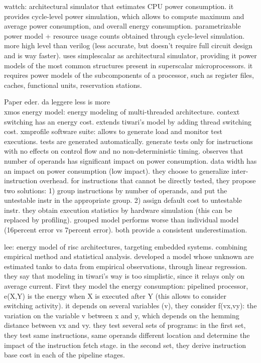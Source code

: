 wattch: architectural simulator that estimates CPU power consumption.
it provides cycle-level power simulation, which allows to compute maximum and average power consumption, and overall energy consumption.
parametrizable power model + resource usage counts obtained through cycle-level simulation. more high level than verilog (less accurate, but doesn't require full circuit design and is way faster). uses simplescalar as architectural simulator, providing it power models of the most common structures present in superscalar microprocessors.
it requires power models of the subcomponents of a processor, such as register files, caches, functional units, reservation stations.
 
Paper eder. 
da leggere less is more\\
xmos energy model: energy modeling of multi-threaded architecture. context switching has an energy cost. extends tiwari's model by adding thread switching cost. xmprofile software suite: allows to generate load and monitor test executions. tests are generated automatically. generate tests only for instructions with no effects on control flow and no non-deterministic timing.
observes that number of operands has significant impact on power consumption. data width has an impact on power consumption (low impact). they choose to generalize inter-instruction overhead. 
for instructions that cannot be directly tested, they propose two solutions: 1) group instructions by number of operands, and put the untestable instr in the appropriate group. 2) assign default cost to untestable instr. 
they obtain execution statistics by hardware simulation (this can be replaced by profiling).
grouped model performs worse than individual model (16percent error vs 7percent error). both provide a consistent underestimation.


lee: energy model of risc architectures, targeting embedded systems. combining empirical method and statistical analysis.
developed a model whose unknown are estimated tanks to data from empirical observations, through linear regression. they say that modeling in tiwari's way is too simplistic, since it relays only on average current.  
First they model the energy consumption: pipelined processor, e(X,Y) is the energy when X is executed after Y (this allows to consider switching activity). it depends on several variables (v), they consider f(vx,vy): the variation on the variable v between x and y, which depends on the hemming distance between vx and vy. 
they test several sets of programs: in the first set, they test same instructions, same operands different location and determine the impact of the instruction fetch stage. in the second set, they derive instruction base cost in each of the pipeline stages.

